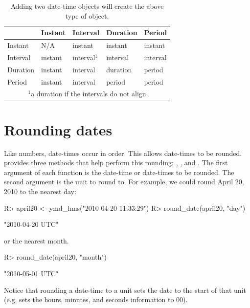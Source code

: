 \documentclass[article]{jss}
\begin{document}
\begin{table}
  \begin{center}
  \begin{tabular}{lllll}
  \toprule
  & Instant & Interval & Duration & Period\\
  \midrule
  Instant & N/A & instant & instant & instant\\
  Interval & instant & interval$^{1}$ & interval & interval\\
  Duration & instant & interval & duration & period\\
  Period & instant & interval & period & period\\
  \bottomrule
  \multicolumn{5}{c}{\footnotesize{$^{1}$a duration if the intervals do not align}}\\
    
  \end{tabular}
  \end{center}
  \caption{Adding two date-time objects will create the above type of object.}
  \label{tbl:date-math}
\end{table}

\section{Rounding dates}
\label{sec:rounding}
Like numbers, date-times occur in order. This allows date-times to be rounded.  provides three methods that help perform this rounding: , , and . The first argument of each function is the date-time or date-times to be rounded. The second argument is the unit to round to. For example, we could round April 20, 2010 to the nearest day:

\begin{CodeInput}
R> april20 <- ymd_hms("2010-04-20 11:33:29")
R> round_date(april20, "day")
\end{CodeInput}
\begin{CodeOutput}
[1] "2010-04-20 UTC"
\end{CodeOutput}

or the nearest month.

\begin{CodeInput}
R> round_date(april20, "month")
\end{CodeInput}
\begin{CodeOutput}
[1] "2010-05-01 UTC"
\end{CodeOutput}

Notice that rounding a date-time to a unit sets the date to the start of that unit (e.g,  sets the hours, minutes, and seconds information to 00).
\end{document}
